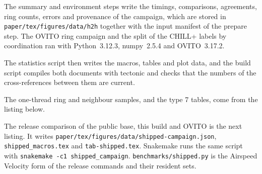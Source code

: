 \documentclass[preprint,12pt]{elsarticle}
\begin{document}
The summary and environment steps write the timings, comparisons,
agreements, ring counts, errors and provenance of the campaign, which
are stored in \texttt{paper/tex/figures/data/h2h} together with the
input manifest of the prepare step.
The OVITO ring campaign and the split of the CHILL+ labels by
coordination ran with Python~3.12.3, numpy~2.5.4 and OVITO~3.17.2.

The statistics script then writes the macros, tables and plot data, and
the build script compiles both documents with tectonic and checks that
the numbers of the cross-references between them are current.

The one-thread ring and neighbour samples, and the type 7 tables, come
from the listing below.

The release comparison of the public base, this build and OVITO is the
next listing.
It writes \texttt{paper/tex/figures/data/shipped-campaign.json},
\texttt{shipped\_macros.tex} and \texttt{tab-shipped.tex}.
Snakemake runs the same script with
\texttt{snakemake -c1 shipped\_campaign}.
\texttt{benchmarks/shipped.py} is the Airspeed Velocity form of the
release commands and their resident sets.

 
\end{document}
